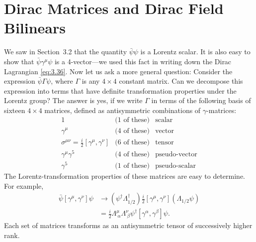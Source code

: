 \section{Dirac Matrices and Dirac Field Bilinears}

We saw in Section~3.2 that the quantity $\bar{\psi}\psi$ is a Lorentz scalar.
It is also easy to show that $\bar{\psi}\gamma^\mu\psi$ is a 4-vector---we used
this fact in writing down the Dirac Lagrangian \eqref{eq:3.36}.  Now let us
ask a more general question: Consider the expression $\bar{\psi}\Gamma\psi$,
where $\Gamma$ is any $4\times4$ constant matrix.  Can we decompose this
expression into terms that have definite transformation properties under the
Lorentz group?  The answer is yes, if we write $\Gamma$ in terms of the
following basis of sixteen $4\times4$ matrices, defined as antisymmetric
combinations of $\gamma$-matrices:
\begin{equation}
  \begin{array}{lll}
    1 & \text{(1 of these)} & \text{scalar}\\
    \gamma^\mu & \text{(4 of these)} & \text{vector}\\
    \sigma^{\mu\nu} = \tfrac{i}{2}[\gamma^\mu,\gamma^\nu] &
      \text{(6 of these)} & \text{tensor}\\
    \gamma^\mu\gamma^5 & \text{(4 of these)} & \text{pseudo-vector}\\
    \gamma^5 & \text{(1 of these)} & \text{pseudo-scalar}
  \end{array}
\end{equation}
The Lorentz-transformation properties of these matrices are easy to
determine.  For example,
\begin{align}
  \bar{\psi}[\gamma^\mu,\gamma^\nu]\psi
  &\to (\psi^\dagger\Lambda_{1/2}^\dagger)
    \tfrac{i}{2}[\gamma^\mu,\gamma^\nu](\Lambda_{1/2}\psi)\\
  &= \tfrac{i}{2}\Lambda^{\mu}_{\ \alpha}\Lambda^{\nu}_{\ \beta}
    \psi^\dagger[\gamma^\alpha,\gamma^\beta]\psi .
\end{align}
Each set of matrices transforms as an antisymmetric tensor of successively
higher rank.

